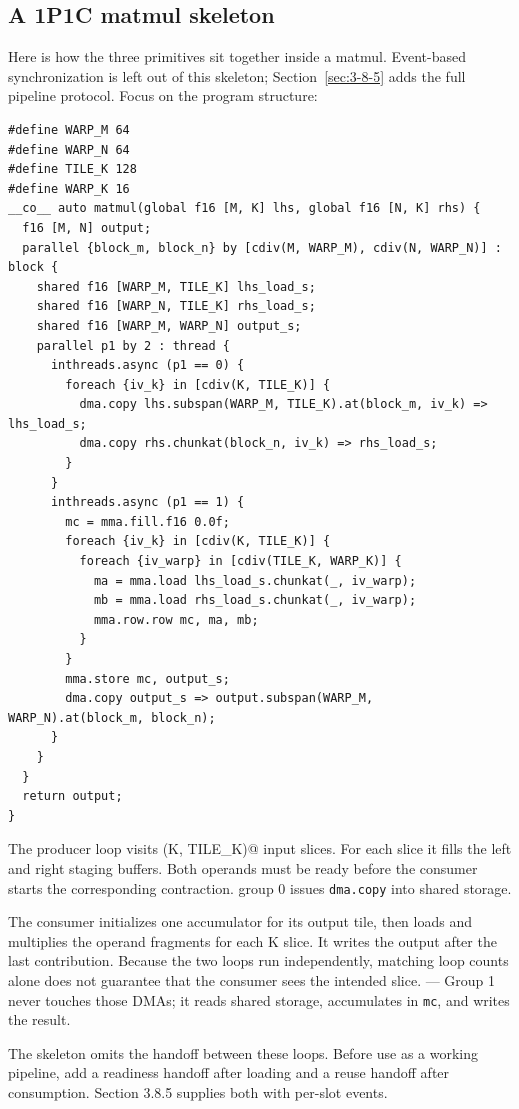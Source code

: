 \subsection*{A 1P1C matmul skeleton}

Here is how the three primitives sit together inside a matmul. Event-based synchronization is left out of this skeleton; Section~\ref{sec:3-8-5} adds the full pipeline protocol. Focus on the program structure:

\begin{lstlisting}[language=croqtile,caption={A 1P1C matmul skeleton}]
#define WARP_M 64
#define WARP_N 64
#define TILE_K 128
#define WARP_K 16
__co__ auto matmul(global f16 [M, K] lhs, global f16 [N, K] rhs) {
  f16 [M, N] output;
  parallel {block_m, block_n} by [cdiv(M, WARP_M), cdiv(N, WARP_N)] : block {
    shared f16 [WARP_M, TILE_K] lhs_load_s;
    shared f16 [WARP_N, TILE_K] rhs_load_s;
    shared f16 [WARP_M, WARP_N] output_s;
    parallel p1 by 2 : thread {
      inthreads.async (p1 == 0) {
        foreach {iv_k} in [cdiv(K, TILE_K)] {
          dma.copy lhs.subspan(WARP_M, TILE_K).at(block_m, iv_k) => lhs_load_s;
          dma.copy rhs.chunkat(block_n, iv_k) => rhs_load_s;
        }
      }
      inthreads.async (p1 == 1) {
        mc = mma.fill.f16 0.0f;
        foreach {iv_k} in [cdiv(K, TILE_K)] {
          foreach {iv_warp} in [cdiv(TILE_K, WARP_K)] {
            ma = mma.load lhs_load_s.chunkat(_, iv_warp);
            mb = mma.load rhs_load_s.chunkat(_, iv_warp);
            mma.row.row mc, ma, mb;
          }
        }
        mma.store mc, output_s;
        dma.copy output_s => output.subspan(WARP_M, WARP_N).at(block_m, block_n);
      }
    }
  }
  return output;
}
\end{lstlisting}

The producer loop visits \co@cdiv(K, TILE_K)@ input slices. For each slice it fills the left and right staging buffers. Both operands must be ready before the consumer starts the corresponding contraction. group 0 issues \texttt{dma.copy} into shared storage.

The consumer initializes one accumulator for its output tile, then loads and multiplies the operand fragments for each K slice. It writes the output after the last contribution. Because the two loops run independently, matching loop counts alone does not guarantee that the consumer sees the intended slice. --- Group 1 never touches those DMAs; it reads shared storage, accumulates in \texttt{mc}, and writes the result.

The skeleton omits the handoff between these loops. Before use as a working pipeline, add a readiness handoff after loading and a reuse handoff after consumption. Section 3.8.5 supplies both with per-slot events.
